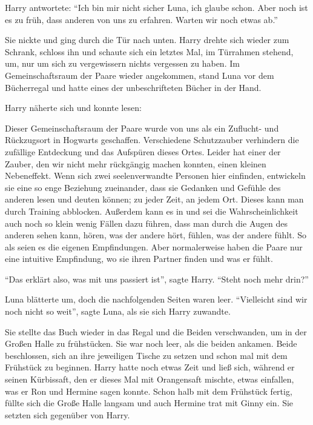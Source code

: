 Harry antwortete: \enquote{Ich bin mir nicht sicher Luna, ich glaube schon. Aber noch ist es zu früh, dass anderen von uns zu erfahren. Warten wir noch etwas ab.}

Sie nickte und ging durch die Tür nach unten. Harry drehte sich wieder zum Schrank, schloss ihn und schaute sich ein letztes Mal, im Türrahmen stehend, um, nur um sich zu vergewissern nichts vergessen zu haben. Im Gemeinschaftsraum der Paare wieder angekommen, stand Luna vor dem Bücherregal und hatte eines der unbeschrifteten Bücher in der Hand.

Harry näherte sich und konnte lesen:

\begin{brief}
Dieser Gemeinschaftsraum der Paare wurde von uns als ein Zuflucht- und Rückzugsort in Hogwarts geschaffen. Verschiedene Schutzzauber verhindern die zufällige Entdeckung und das Aufspüren dieses Ortes. Leider hat einer der Zauber, den wir nicht mehr rückgängig machen konnten, einen kleinen Nebeneffekt. Wenn sich zwei seelenverwandte Personen hier einfinden, entwickeln sie eine so enge Beziehung zueinander, dass sie Gedanken und Gefühle des anderen lesen und deuten können; zu jeder Zeit, an jedem Ort. Dieses kann man durch Training abblocken. Außerdem kann es in \gst und sei die Wahrscheinlichkeit auch noch so klein \gst wenig Fällen dazu führen, dass man durch die Augen des anderen sehen kann, hören, was der andere hört, fühlen, was der andere fühlt. So als seien es die eigenen Empfindungen. Aber normalerweise haben die Paare nur eine intuitive Empfindung, wo sie ihren Partner finden und was er fühlt.
\end{brief}

\enquote{Das erklärt also, was mit uns passiert ist}, sagte Harry. \enquote{Steht noch mehr drin?}

Luna blätterte um, doch die nachfolgenden Seiten waren leer. \enquote{Vielleicht sind wir noch nicht so weit}, sagte Luna, als sie sich Harry zuwandte.

Sie stellte das Buch wieder in das Regal und die Beiden verschwanden, um in der Großen Halle zu frühstücken. Sie war noch leer, als die beiden ankamen. Beide beschlossen, sich an ihre jeweiligen Tische zu setzen und schon mal mit dem Frühstück zu beginnen. Harry hatte noch etwas Zeit und ließ sich, während er seinen Kürbissaft, den er dieses Mal mit Orangensaft mischte, etwas einfallen, was er Ron und Hermine sagen konnte. Schon halb mit dem Frühstück fertig, füllte sich die Große Halle langsam und auch Hermine trat mit Ginny ein. Sie setzten sich gegenüber von Harry.

